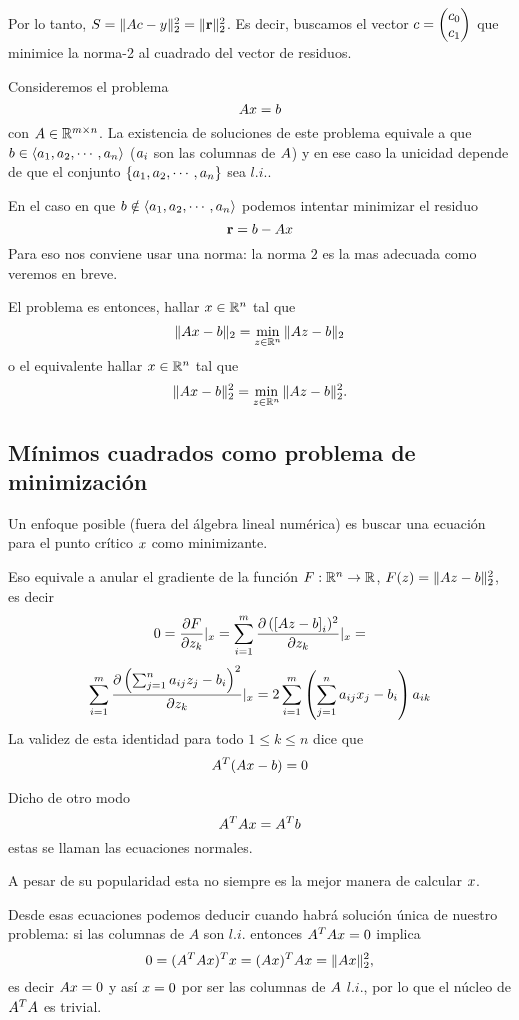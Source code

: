 Por lo tanto, $S = \|\Ab \cb - \yb\|_2^2 = \|\rb\|_2^2$. Es decir, buscamos el vector $\cb = \begin{pmatrix}
c_0 \\
c_1
\end{pmatrix}$ que minimice la norma-2 al cuadrado del vector de residuos.




Consideremos el problema
$$
\Ab\xb=\bb
$$
con $\Ab\in \Rmn$. La existencia de soluciones de este problema equivale a que
$\bb\in \langle \ab_1,  \ab_2,\cdots , \ab_n\rangle$ ($\ab_{i}$ son las columnas de $\Ab$) y en ese caso la unicidad depende de que el conjunto
$\{ \ab_1,  \ab_2,\cdots , \ab_n\}$ sea $l.i.$.

En el caso en que $\bb\notin \langle  \ab_1,  \ab_2,\cdots , \ab_n\rangle$
podemos intentar minimizar el residuo
$$
\rb=\bb-\Ab\xb
$$
Para eso nos conviene usar una norma: la norma $2$  es la mas adecuada como veremos en breve.

El problema es entonces,  hallar $\xb\in \Rn$ tal que
$$
\|\Ab\xb-\bb\|_2=\min_{\zb\in \Rn}\|\Ab\zb-\bb\|_2
$$
o el equivalente
hallar $\xb\in \Rn$ tal que
$$
\|\Ab\xb-\bb\|_2^2=\min_{\zb\in \Rn}\|\Ab\zb-\bb\|_2^2.
$$

\subsection{Mínimos cuadrados como problema de minimización}
Un enfoque posible (fuera del álgebra lineal numérica) es buscar una ecuación para el punto crítico $\xb$ como minimizante.

Eso equivale a anular el gradiente de la función $F:\mathbb R^{n}\to \mathbb R$, $F(\zb)=\|\Ab\zb-\bb\|_2^2$, es decir
$$
0=\frac{\partial F}{\partial z_k}|_{\xb}=\sum_{i=1}^m\frac{\partial \left( [\Ab\zb-\bb \right]_i)^2}{\partial z_k}|_{\xb}=
$$
$$
\sum_{i=1}^m\frac{\partial \left( \sum_{j=1}^na_{ij}z_j-b_i \right)^2}{\partial z_k}|_{\xb}=2\sum_{i=1}^m\left( \sum_{j=1}^na_{ij}x_j-b_i\right)a_{ik}
$$
La validez de esta identidad para todo $1\le k\le n$ dice que
$$
\Ab^T(\Ab\xb-\bb)=\cero
$$

Dicho de otro modo
$$
\Ab^T\Ab\xb=\Ab^T\bb
$$
estas se llaman las ecuaciones normales.

A pesar de su popularidad esta no siempre es la mejor manera de calcular $\xb$.


Desde esas ecuaciones podemos deducir cuando habrá solución única de nuestro problema: si las columnas de $A$ son $l.i.$ entonces $\Ab^T\Ab\xb=\cero$ implica
$$
0=(\Ab^T\Ab\xb)^T\xb=(\Ab\xb)^T\Ab\xb=\|\Ab\xb\|_2^2,
$$
es decir $\Ab\xb=\cero$ y así $\xb=\cero$ por ser las columnas de $\Ab$ $l.i.$, por lo que el núcleo de $\Ab^T\Ab$ es trivial.

